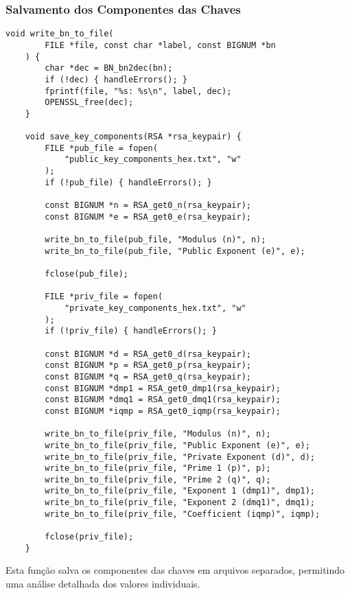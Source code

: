 \documentclass[a4paper,12pt]{article}
\begin{document}
\subsubsection*{Salvamento dos Componentes das Chaves}
\begin{lstlisting}[style=CStyle]
    void write_bn_to_file(
        FILE *file, const char *label, const BIGNUM *bn
    ) {
        char *dec = BN_bn2dec(bn);
        if (!dec) { handleErrors(); }
        fprintf(file, "%s: %s\n", label, dec);
        OPENSSL_free(dec);
    }
    
    void save_key_components(RSA *rsa_keypair) {
        FILE *pub_file = fopen(
            "public_key_components_hex.txt", "w"
        );
        if (!pub_file) { handleErrors(); }
    
        const BIGNUM *n = RSA_get0_n(rsa_keypair);
        const BIGNUM *e = RSA_get0_e(rsa_keypair);
    
        write_bn_to_file(pub_file, "Modulus (n)", n);
        write_bn_to_file(pub_file, "Public Exponent (e)", e);
    
        fclose(pub_file);
    
        FILE *priv_file = fopen(
            "private_key_components_hex.txt", "w"
        );
        if (!priv_file) { handleErrors(); }
    
        const BIGNUM *d = RSA_get0_d(rsa_keypair);
        const BIGNUM *p = RSA_get0_p(rsa_keypair);
        const BIGNUM *q = RSA_get0_q(rsa_keypair);
        const BIGNUM *dmp1 = RSA_get0_dmp1(rsa_keypair);
        const BIGNUM *dmq1 = RSA_get0_dmq1(rsa_keypair);
        const BIGNUM *iqmp = RSA_get0_iqmp(rsa_keypair);
    
        write_bn_to_file(priv_file, "Modulus (n)", n);
        write_bn_to_file(priv_file, "Public Exponent (e)", e);
        write_bn_to_file(priv_file, "Private Exponent (d)", d);
        write_bn_to_file(priv_file, "Prime 1 (p)", p);
        write_bn_to_file(priv_file, "Prime 2 (q)", q);
        write_bn_to_file(priv_file, "Exponent 1 (dmp1)", dmp1);
        write_bn_to_file(priv_file, "Exponent 2 (dmq1)", dmq1);
        write_bn_to_file(priv_file, "Coefficient (iqmp)", iqmp);
    
        fclose(priv_file);
    }
\end{lstlisting}
Esta função salva os componentes das chaves em arquivos separados, permitindo uma análise detalhada dos valores individuais.
\end{document}

